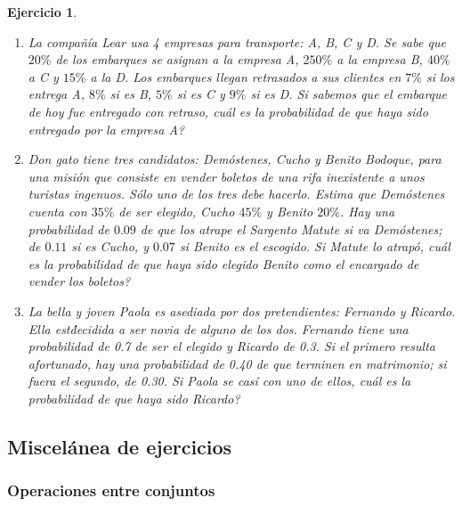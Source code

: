 \documentclass[12pt,twoside]{article}
\newtheorem{Ejer}{Ejercicio}
\begin{document}
\begin{Ejer}
\begin{enumerate}
\item La compa\~n\'ia Lear usa 4 empresas para transporte: A, B, C y D. Se sabe que $20\%$ de los embarques se asignan a la empresa A, $250\%$ a la empresa B, $40\%$ a C y $15\%$ a la D. Los embarques llegan retrasados a sus clientes en $7\%$ si los entrega A, $8\%$ si es B, $5\%$ si es C y $9\%$ si es D. Si sabemos que el embarque de hoy fue entregado con retraso,  cu\'al es la probabilidad de que haya sido entregado por la empresa A?

\item Don gato tiene tres candidatos: Dem\'ostenes, Cucho y Benito Bodoque, para una misi\'on que consiste en vender boletos de una rifa inexistente a unos turistas ingenuos. S\'olo uno de los tres debe hacerlo. Estima que Dem\'ostenes cuenta con $35\%$ de ser elegido, Cucho $45\%$ y Benito $20\%$. Hay una probabilidad de $0.09$ de que los atrape el Sargento Matute si va Dem\'ostenes; de $0.11$ si es Cucho, y $0.07$ si Benito es el escogido. Si Matute lo atrap\'o, cu\'al es la probabilidad de que haya sido elegido Benito como el encargado de vender los boletos?

\item La bella y joven Paola es asediada por dos pretendientes: Fernando y Ricardo. Ella est\' decidida a ser novia de alguno de los dos. Fernando tiene una probabilidad de 0.7 de ser el elegido y Ricardo de 0.3. Si el primero resulta afortunado, hay una probabilidad de 0.40 de que terminen en matrimonio; si fuera el segundo, de 0.30. Si Paola se cas\'i con uno de ellos,  cu\'al es la probabilidad de que haya sido Ricardo?
\end{enumerate}
\end{Ejer}




\subsection{Miscel\'anea de ejercicios}


\subsubsection*{Operaciones entre conjuntos}
\end{document}
